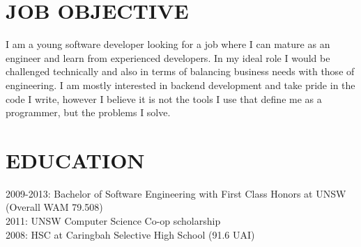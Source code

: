 \documentclass{res}
\begin{document}
 


\address{16A Old Forest Rd \\  Lugarno, NSW 2210
         \\  grasevski@gmail.com
         \\  0405 634 067
	 \\  github.com/grasevski}
                                  
\begin{resume}

\section{JOB OBJECTIVE}          
    I am a young software developer looking for a job where I can mature as an engineer and learn from experienced developers. In my ideal role I would be challenged technically and also in terms of balancing business needs with those of engineering. I am mostly interested in backend development and take pride in the code I write, however I believe it is not the tools I use that define me as a programmer, but the problems I solve.
 
\section{EDUCATION}          
    2009-2013: Bachelor of Software Engineering with First Class Honors at UNSW (Overall WAM 79.508) \\
    2011: UNSW Computer Science Co-op scholarship \\
    2008: HSC at Caringbah Selective High School (91.6 UAI)

 

\end{resume}
\end{document}
